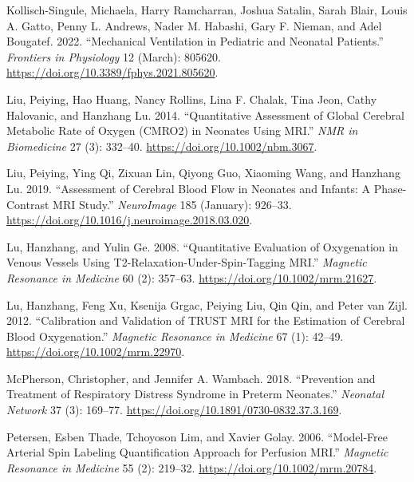 \documentclass[
  letterpaper,
  DIV=11,
  numbers=noendperiod]{scrartcl}
\newlength{\cslhangindent}
\newenvironment{CSLReferences}[2] %
 {\begin{list}{}{%
  \setlength{\itemindent}{0pt}
  \setlength{\leftmargin}{0pt}
  \setlength{\parsep}{0pt}
  \ifodd #1
   \setlength{\leftmargin}{\cslhangindent}
   \setlength{\itemindent}{-1\cslhangindent}
  \fi
  \setlength{\itemsep}{#2\baselineskip}}}
 {\end{list}}
\begin{document}
\begin{CSLReferences}{1}{0}
Kollisch-Singule, Michaela, Harry Ramcharran, Joshua Satalin, Sarah
Blair, Louis A. Gatto, Penny L. Andrews, Nader M. Habashi, Gary F.
Nieman, and Adel Bougatef. 2022. {``Mechanical {Ventilation} in
{Pediatric} and {Neonatal Patients}.''} \emph{Frontiers in Physiology}
12 (March): 805620. \url{https://doi.org/10.3389/fphys.2021.805620}.

Liu, Peiying, Hao Huang, Nancy Rollins, Lina F. Chalak, Tina Jeon, Cathy
Halovanic, and Hanzhang Lu. 2014. {``Quantitative Assessment of Global
Cerebral Metabolic Rate of Oxygen ({CMRO2}) in Neonates Using {MRI}.''}
\emph{NMR in Biomedicine} 27 (3): 332--40.
\url{https://doi.org/10.1002/nbm.3067}.

Liu, Peiying, Ying Qi, Zixuan Lin, Qiyong Guo, Xiaoming Wang, and
Hanzhang Lu. 2019. {``Assessment of Cerebral Blood Flow in Neonates and
Infants: {A} Phase-Contrast {MRI} Study.''} \emph{NeuroImage} 185
(January): 926--33.
\url{https://doi.org/10.1016/j.neuroimage.2018.03.020}.

Lu, Hanzhang, and Yulin Ge. 2008. {``Quantitative Evaluation of
Oxygenation in Venous Vessels Using {T2-Relaxation-Under-Spin-Tagging
MRI}.''} \emph{Magnetic Resonance in Medicine} 60 (2): 357--63.
\url{https://doi.org/10.1002/mrm.21627}.

Lu, Hanzhang, Feng Xu, Ksenija Grgac, Peiying Liu, Qin Qin, and Peter
van Zijl. 2012. {``Calibration and Validation of {TRUST MRI} for the
Estimation of Cerebral Blood Oxygenation.''} \emph{Magnetic Resonance in
Medicine} 67 (1): 42--49. \url{https://doi.org/10.1002/mrm.22970}.

McPherson, Christopher, and Jennifer A. Wambach. 2018. {``Prevention and
{Treatment} of {Respiratory Distress Syndrome} in {Preterm Neonates}.''}
\emph{Neonatal Network} 37 (3): 169--77.
\url{https://doi.org/10.1891/0730-0832.37.3.169}.

Petersen, Esben Thade, Tchoyoson Lim, and Xavier Golay. 2006.
{``Model-Free Arterial Spin Labeling Quantification Approach for
Perfusion {MRI}.''} \emph{Magnetic Resonance in Medicine} 55 (2):
219--32. \url{https://doi.org/10.1002/mrm.20784}.


\end{CSLReferences}
\end{document}
